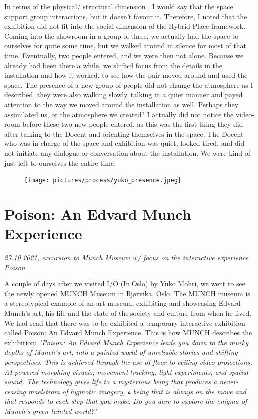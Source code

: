 In terms of the physical/ structural dimension \autocite{hybridplace_ciolfi}, I would say that the space support group interactions, but it doesn't favour it. Therefore, I noted that the exhibition did not fit into the social dimension of the Hybrid Place framework. Coming into the showroom in a group of three, we actually had the space to ourselves for quite some time, but we walked around in silence for most of that time. Eventually, two people entered, and we were then not alone. Because we already had been there a while, we shifted focus from the details in the installation and how it worked, to see how the pair moved around and used the space. The presence of a new group of people did not change the atmosphere as I described, they were also walking slowly, talking in a quiet manner and payed attention to the way we moved around the installation as well. Perhaps they assimilated us, or the atmosphere we created? I actually did not notice the video-room before these two new people entered, as this was the first thing they did after talking to the Docent and orienting themselves in the space. The Docent who was in charge of the space and exhibition was quiet, looked tired, and did not initiate any dialogue or conversation about the installation. We were kind of just left to ourselves the entire time.


\begin{figure}[H]
\texttt{[image: pictures/process/yuko\_presence.jpeg]}
\centering 
\end{figure}

\section{Poison: An Edvard Munch Experience}
\par
\emph{27.10.2021, excursion to Munch Museum w/ focus on the interactive experience Poison}
\par

A couple of days after we visited I/O (In Oslo) by Yuko Mohri, we went to see the newly opened MUNCH Museum in Bjørvika, Oslo. The MUNCH museum is a stereotypical example of an art museum, exhibiting and showcasing Edvard Munch's art, his life and the state of the society and culture from when he lived. We had read that there was to be exhibited a temporary interactive exhibition called Poison: An Edvard Munch Experience. This is how MUNCH describes the exhibition: \emph{"Poison: An Edvard Munch Experience leads you down to the murky depths of Munch’s art, into a painted world of unreliable stories and shifting perspectives. This is achieved through the use of floor-to-ceiling video projections, AI-powered morphing visuals, movement tracking, light experiments, and spatial sound. The technology gives life to a mysterious being that produces a never-ceasing maelstrom of hypnotic imagery, a being that is always on the move and that responds to each step that you make. Do you dare to explore the enigma of Munch’s green-tainted world?"}\autocite{munch_poison_web}

